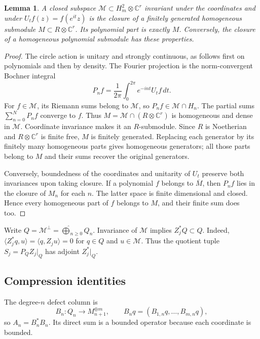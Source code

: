 \documentclass[11pt,reqno]{amsart}
\numberwithin{equation}{section}
\newtheorem{lemma}[theorem]{Lemma}
\theoremstyle{definition}
\theoremstyle{remark}
\newcommand{\C}{\mathbb C}
\begin{document}
\begin{lemma}\label{op:graded}
A closed subspace $\mathcal M\subset H_m^2\otimes\C^r$ invariant under
the coordinates and under $U_t f(z)=f(e^{it}z)$ is the closure of a
finitely generated homogeneous submodule $M\subset R\otimes\C^r$.
Its polynomial part is exactly $M$.  Conversely, the closure of a
homogeneous polynomial submodule has these properties.
\end{lemma}
\begin{proof}
The circle action is unitary and strongly continuous, as follows first
on polynomials and then by density.  The Fourier projection is the
norm-convergent Bochner integral
\[
 P_nf=\frac1{2\pi}\int_0^{2\pi}e^{-int}U_tf\,dt.
\]
For $f\in\mathcal M$, its Riemann sums belong to $\mathcal M$, so
$P_nf\in\mathcal M\cap H_n$.  The partial sums $\sum_{n=0}^NP_nf$
converge to $f$.  Thus $M=\mathcal M\cap(R\otimes\C^r)$ is homogeneous
and dense in $\mathcal M$.  Coordinate invariance makes it an
$R$-submodule.  Since $R$ is Noetherian and $R\otimes\C^r$ is finite
free, $M$ is finitely generated.  Replacing each generator by its finitely
many homogeneous parts gives homogeneous generators; all those parts
belong to $M$ and their sums recover the original generators.

Conversely, boundedness of the coordinates and unitarity of $U_t$ preserve
both invariances upon taking closure.  If a polynomial $f$ belongs to
$\overline M$, then $P_nf$ lies in the closure of $M_n$ for each $n$.
The latter space is finite dimensional and closed.  Hence every
homogeneous part of $f$ belongs to $M$, and their finite sum does too.
\end{proof}

Write $Q=\mathcal M^\perp=\widehat\bigoplus_{n\ge0}Q_n$.
Invariance of $\mathcal M$ implies $Z_j^*Q\subset Q$.  Indeed,
$\langle Z_j^*q,u\rangle=\langle q,Z_ju\rangle=0$ for
$q\in Q$ and $u\in\mathcal M$.  Thus the quotient tuple
$S_j=P_QZ_j|_Q$ has adjoint $Z_j^*|_Q$.

\subsection{Compression identities}
The degree-$n$ defect column is
\[
 B_n:Q_n\longrightarrow M_{n+1}^{\oplus m},\qquad
 B_nq=(B_{1,n}q,\ldots,B_{m,n}q),
\]
so $A_n=B_n^*B_n$.  Its direct sum is a bounded operator because
each coordinate is bounded.
\end{document}
